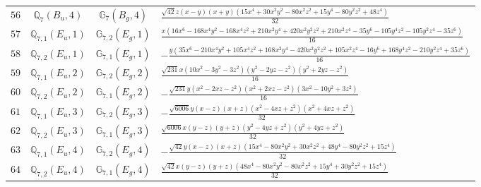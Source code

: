 \documentclass[fleqn,8pt,landscape]{jsarticle}
\begin{document}
\begin{table}[ht!]
\begin{center}
\begin{tabular}{cccl}
$ 56 $ & $ \mathbb{Q}_{7}(B_{u},4) $ & $ \mathbb{G}_{7}(B_{g},4) $ & $ \frac{\sqrt{42} z \left(x - y\right) \left(x + y\right) \left(15 x^{4} + 30 x^{2} y^{2} - 80 x^{2} z^{2} + 15 y^{4} - 80 y^{2} z^{2} + 48 z^{4}\right)}{32} $ \\
$ 57 $ & $ \mathbb{Q}_{7,1}(E_{u},1) $ & $ \mathbb{G}_{7,2}(E_{g},1) $ & $ \frac{x \left(16 x^{6} - 168 x^{4} y^{2} - 168 x^{4} z^{2} + 210 x^{2} y^{4} + 420 x^{2} y^{2} z^{2} + 210 x^{2} z^{4} - 35 y^{6} - 105 y^{4} z^{2} - 105 y^{2} z^{4} - 35 z^{6}\right)}{16} $ \\
$ 58 $ & $ \mathbb{Q}_{7,2}(E_{u},1) $ & $ \mathbb{G}_{7,1}(E_{g},1) $ & $ - \frac{y \left(35 x^{6} - 210 x^{4} y^{2} + 105 x^{4} z^{2} + 168 x^{2} y^{4} - 420 x^{2} y^{2} z^{2} + 105 x^{2} z^{4} - 16 y^{6} + 168 y^{4} z^{2} - 210 y^{2} z^{4} + 35 z^{6}\right)}{16} $ \\
$ 59 $ & $ \mathbb{Q}_{7,1}(E_{u},2) $ & $ \mathbb{G}_{7,2}(E_{g},2) $ & $ \frac{\sqrt{231} x \left(10 x^{2} - 3 y^{2} - 3 z^{2}\right) \left(y^{2} - 2 y z - z^{2}\right) \left(y^{2} + 2 y z - z^{2}\right)}{16} $ \\
$ 60 $ & $ \mathbb{Q}_{7,2}(E_{u},2) $ & $ \mathbb{G}_{7,1}(E_{g},2) $ & $ - \frac{\sqrt{231} y \left(x^{2} - 2 x z - z^{2}\right) \left(x^{2} + 2 x z - z^{2}\right) \left(3 x^{2} - 10 y^{2} + 3 z^{2}\right)}{16} $ \\
$ 61 $ & $ \mathbb{Q}_{7,1}(E_{u},3) $ & $ \mathbb{G}_{7,2}(E_{g},3) $ & $ - \frac{\sqrt{6006} y \left(x - z\right) \left(x + z\right) \left(x^{2} - 4 x z + z^{2}\right) \left(x^{2} + 4 x z + z^{2}\right)}{32} $ \\
$ 62 $ & $ \mathbb{Q}_{7,2}(E_{u},3) $ & $ \mathbb{G}_{7,1}(E_{g},3) $ & $ \frac{\sqrt{6006} x \left(y - z\right) \left(y + z\right) \left(y^{2} - 4 y z + z^{2}\right) \left(y^{2} + 4 y z + z^{2}\right)}{32} $ \\
$ 63 $ & $ \mathbb{Q}_{7,1}(E_{u},4) $ & $ \mathbb{G}_{7,2}(E_{g},4) $ & $ - \frac{\sqrt{42} y \left(x - z\right) \left(x + z\right) \left(15 x^{4} - 80 x^{2} y^{2} + 30 x^{2} z^{2} + 48 y^{4} - 80 y^{2} z^{2} + 15 z^{4}\right)}{32} $ \\
$ 64 $ & $ \mathbb{Q}_{7,2}(E_{u},4) $ & $ \mathbb{G}_{7,1}(E_{g},4) $ & $ \frac{\sqrt{42} x \left(y - z\right) \left(y + z\right) \left(48 x^{4} - 80 x^{2} y^{2} - 80 x^{2} z^{2} + 15 y^{4} + 30 y^{2} z^{2} + 15 z^{4}\right)}{32} $ \\
 \hline \hline
\end{tabular}
\end{center}
\end{table}
\end{document}
